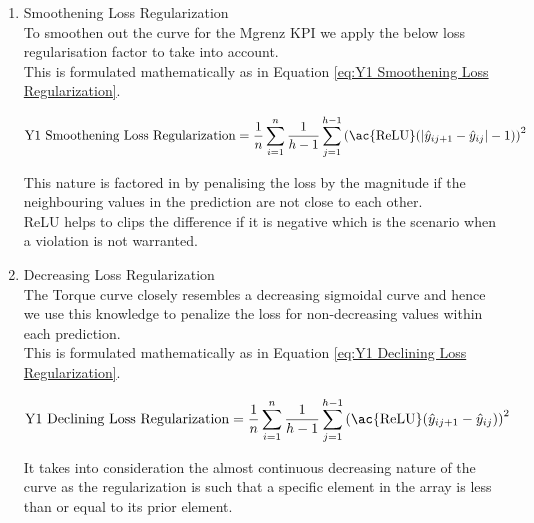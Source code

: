 \documentclass{report} %
\begin{document}
\begin{enumerate}

    \item Smoothening Loss Regularization \\

To smoothen out the curve for the Mgrenz \ac{KPI} we apply the below loss regularisation factor to take into account.\\
This is formulated mathematically as in Equation \ref{eq:Y1 Smoothening Loss Regularization}.

\begin{equation}
\text{Y1 Smoothening Loss Regularization} = \frac{1}{n} \sum_{i=1}^{n}\frac{1}{h-1} \sum_{j=1}^{h-1} \left(\text{\ac{ReLU}}(|\hat{y}_{i{j+1}} - \hat{y}_{ij}| - 1)\right)^2 
\label{eq:Y1 Smoothening Loss Regularization}
\end{equation} 

\vspace{0.2cm} %

This nature is factored in by penalising the loss by the magnitude if the neighbouring values in the prediction are not close to each other.\\
\ac{ReLU} helps to clips the difference if it is negative which is the scenario when a violation is not warranted. \\

\item Decreasing Loss Regularization \\

The Torque curve closely resembles a decreasing sigmoidal curve and hence we use this knowledge to penalize the loss for non-decreasing values within each prediction. \\
This is formulated mathematically as in Equation \ref{eq:Y1 Declining Loss Regularization}.

\begin{equation}
    \text{Y1 Declining Loss Regularization} = \frac{1}{n} \sum_{i=1}^{n}\frac{1}{h-1} \sum_{j=1}^{h-1} \left(\text{\ac{ReLU}}(\hat{y}_{i{j+1}} - \hat{y}_{ij})\right)^2
    \label{eq:Y1 Declining Loss Regularization}
\end{equation} 
    
It takes into consideration the almost continuous decreasing nature of the curve as the regularization is such that a specific element in the array is less than or equal to its prior element. \\


\end{enumerate}
\end{document}
